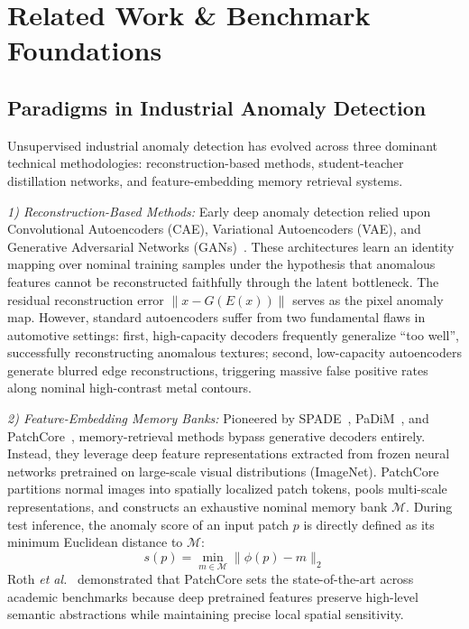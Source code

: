 \documentclass[journal,twocolumn]{IEEEtran}
\begin{document}
\section{Related Work \& Benchmark Foundations}
\subsection{Paradigms in Industrial Anomaly Detection}
Unsupervised industrial anomaly detection has evolved across three dominant technical methodologies: reconstruction-based methods, student-teacher distillation networks, and feature-embedding memory retrieval systems.

\textit{1) Reconstruction-Based Methods:} Early deep anomaly detection relied upon Convolutional Autoencoders (CAE), Variational Autoencoders (VAE), and Generative Adversarial Networks (GANs)~\cite{bergmann2019mvtec, zou2023spotdiff}. These architectures learn an identity mapping over nominal training samples under the hypothesis that anomalous features cannot be reconstructed faithfully through the latent bottleneck. The residual reconstruction error $\|x - G(E(x))\|$ serves as the pixel anomaly map. However, standard autoencoders suffer from two fundamental flaws in automotive settings: first, high-capacity decoders frequently generalize ``too well'', successfully reconstructing anomalous textures; second, low-capacity autoencoders generate blurred edge reconstructions, triggering massive false positive rates along nominal high-contrast metal contours.

\textit{2) Feature-Embedding Memory Banks:} Pioneered by SPADE~\cite{cohen2020sub}, PaDiM~\cite{defard2021padim}, and PatchCore~\cite{roth2022towards}, memory-retrieval methods bypass generative decoders entirely. Instead, they leverage deep feature representations extracted from frozen neural networks pretrained on large-scale visual distributions (ImageNet). PatchCore partitions normal images into spatially localized patch tokens, pools multi-scale representations, and constructs an exhaustive nominal memory bank $\mathcal{M}$. During test inference, the anomaly score of an input patch $p$ is directly defined as its minimum Euclidean distance to $\mathcal{M}$:
\begin{equation}
s(p) = \min_{m \in \mathcal{M}} \|\phi(p) - m\|_2
\end{equation}
Roth \textit{et al.}~\cite{roth2022towards} demonstrated that PatchCore sets the state-of-the-art across academic benchmarks because deep pretrained features preserve high-level semantic abstractions while maintaining precise local spatial sensitivity.
\end{document}
